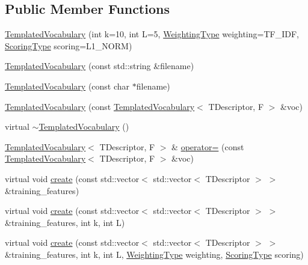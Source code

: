 \subsection*{Public Member Functions}
\begin{DoxyCompactItemize}
\item 
\hyperlink{classDBoW2_1_1TemplatedVocabulary_a0dbbcb6bf766b09f08d945a2af0dbea8}{Templated\+Vocabulary} (int k=10, int L=5, \hyperlink{namespaceDBoW2_a5de5c8a307aca9a84ffefda2a9bc467a}{Weighting\+Type} weighting=T\+F\+\_\+\+I\+DF, \hyperlink{namespaceDBoW2_aa252a592dd607c6e60dede06ceef2722}{Scoring\+Type} scoring=L1\+\_\+\+N\+O\+RM)
\item 
\hyperlink{classDBoW2_1_1TemplatedVocabulary_a72fc6a164a5174003d19bd3c54615de6}{Templated\+Vocabulary} (const std\+::string \&filename)
\item 
\hyperlink{classDBoW2_1_1TemplatedVocabulary_a255d68e7b4235487f8d2d8ea0cbaf43a}{Templated\+Vocabulary} (const char $\ast$filename)
\item 
\hyperlink{classDBoW2_1_1TemplatedVocabulary_aac48ee5331b5d88a4db1a3c93cb0f6a5}{Templated\+Vocabulary} (const \hyperlink{classDBoW2_1_1TemplatedVocabulary}{Templated\+Vocabulary}$<$ T\+Descriptor, F $>$ \&voc)
\item 
virtual \hyperlink{classDBoW2_1_1TemplatedVocabulary_a9d15f985a0c3badc1518be0fbe663099}{$\sim$\+Templated\+Vocabulary} ()
\item 
\hyperlink{classDBoW2_1_1TemplatedVocabulary}{Templated\+Vocabulary}$<$ T\+Descriptor, F $>$ \& \hyperlink{classDBoW2_1_1TemplatedVocabulary_a5355c25b6f37c11acffe48996e19323f}{operator=} (const \hyperlink{classDBoW2_1_1TemplatedVocabulary}{Templated\+Vocabulary}$<$ T\+Descriptor, F $>$ \&voc)
\item 
virtual void \hyperlink{classDBoW2_1_1TemplatedVocabulary_a3679b5a8f2043021a4faab99ccfe4ebe}{create} (const std\+::vector$<$ std\+::vector$<$ T\+Descriptor $>$ $>$ \&training\+\_\+features)
\item 
virtual void \hyperlink{classDBoW2_1_1TemplatedVocabulary_a94d48231b043a1102af4c35e256f2054}{create} (const std\+::vector$<$ std\+::vector$<$ T\+Descriptor $>$ $>$ \&training\+\_\+features, int k, int L)
\item 
virtual void \hyperlink{classDBoW2_1_1TemplatedVocabulary_a1e4a3e90f4aa1e6b6ea4d7491c223fd4}{create} (const std\+::vector$<$ std\+::vector$<$ T\+Descriptor $>$ $>$ \&training\+\_\+features, int k, int L, \hyperlink{namespaceDBoW2_a5de5c8a307aca9a84ffefda2a9bc467a}{Weighting\+Type} weighting, \hyperlink{namespaceDBoW2_aa252a592dd607c6e60dede06ceef2722}{Scoring\+Type} scoring)

\end{DoxyCompactItemize}
